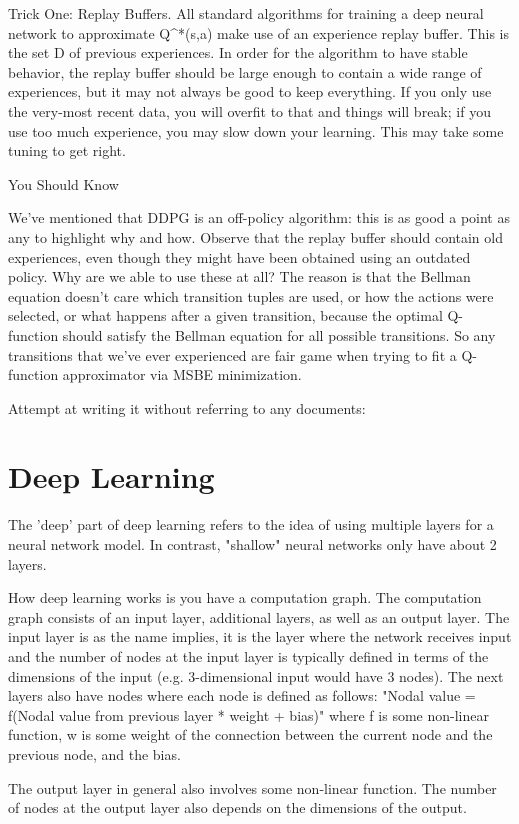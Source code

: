 Trick One: Replay Buffers. All standard algorithms for training a deep neural network to approximate Q^*(s,a) make use of an experience replay buffer. This is the set {\mathcal D} of previous experiences. In order for the algorithm to have stable behavior, the replay buffer should be large enough to contain a wide range of experiences, but it may not always be good to keep everything. If you only use the very-most recent data, you will overfit to that and things will break; if you use too much experience, you may slow down your learning. This may take some tuning to get right.

You Should Know

We've mentioned that DDPG is an off-policy algorithm: this is as good a point as any to highlight why and how. Observe that the replay buffer should contain old experiences, even though they might have been obtained using an outdated policy. Why are we able to use these at all? The reason is that the Bellman equation doesn't care which transition tuples are used, or how the actions were selected, or what happens after a given transition, because the optimal Q-function should satisfy the Bellman equation for all possible transitions. So any transitions that we've ever experienced are fair game when trying to fit a Q-function approximator via MSBE minimization.




Attempt at writing it without referring to any documents:
\section{Deep Learning}
The 'deep' part of deep learning refers to the idea of using multiple layers for a neural network model. In contrast, "shallow" neural networks only have about 2 layers.

How deep learning works is you have a computation graph. The computation graph consists of an input layer, additional layers, as well as an output layer. The input layer is as the name implies, it is the layer where the network receives input and the number of nodes at the input layer is typically defined in terms of the dimensions of the input (e.g. 3-dimensional input would have 3 nodes). The next layers also have nodes where each node is defined as follows: "Nodal value = f(Nodal value from previous layer * weight + bias)" where f is some non-linear function, w is some weight of the connection between the current node and the previous node, and the bias.

The output layer in general also involves some non-linear function. The number of nodes at the output layer also depends on the dimensions of the output.

